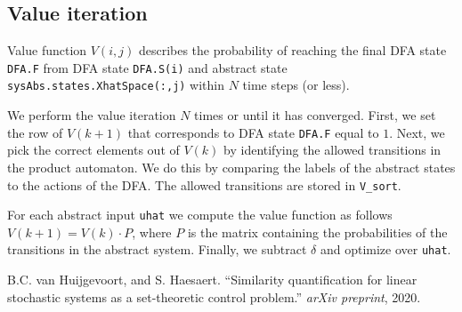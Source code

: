 \documentclass[10pt, onecolumn]{IEEEconf}%
\theoremstyle{definition}
\begin{document}
\subsection*{Value iteration} 
Value function $V(i,j)$ describes the probability of reaching the final DFA state \texttt{DFA.F} from DFA state \texttt{DFA.S(i)} and abstract state \texttt{sysAbs.states.XhatSpace(:,j)} within $N$ time steps (or less). 

We perform the value iteration $N$ times or until it has converged. First, we set the row of $V(k+1)$ that corresponds to DFA state \texttt{DFA.F} equal to $1$. Next, we pick the correct elements out of $V(k)$ by identifying the allowed transitions in the product automaton. We do this by comparing the labels of the abstract states to the actions of the DFA. The allowed transitions are stored in \texttt{V\_sort}. 

For each abstract input \texttt{uhat} we compute the value function as follows $V(k+1) = V(k)\cdot P$, where $P$ is the matrix containing the probabilities of the transitions in the abstract system. Finally, we subtract $\delta$ and optimize over \texttt{uhat}.

\begin{thebibliography}{9}
B.C. van Huijgevoort, and S. Haesaert. ``Similarity quantification for linear stochastic systems as a set-theoretic control problem.'' \textit{arXiv preprint}, 2020.
\end{thebibliography}
\end{document}
